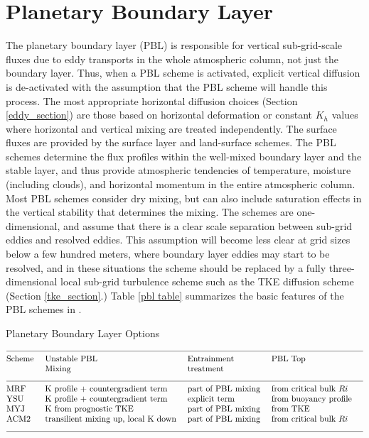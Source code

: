 \section{Planetary Boundary Layer}

The planetary boundary layer (PBL) is responsible for vertical sub-grid-scale 
fluxes due to eddy transports in the whole atmospheric column, not just the 
boundary layer. Thus, when a PBL scheme is activated, explicit vertical 
diffusion is de-activated with the assumption that the PBL scheme will 
handle this process. The most appropriate horizontal diffusion choices
(Section \ref{eddy_section}) are those based on horizontal deformation
or constant $K_h$ values where horizontal and vertical mixing are treated
independently. The surface fluxes are provided by the surface layer 
and land-surface schemes. The PBL schemes determine the flux profiles 
within the well-mixed boundary layer and the stable layer, and thus provide 
atmospheric tendencies of temperature, moisture (including clouds), and 
horizontal momentum in the entire atmospheric column. Most PBL schemes 
consider dry mixing, but can also include saturation effects in the vertical 
stability that determines the mixing. The schemes are one-dimensional, and 
assume that there is a clear scale separation between sub-grid eddies and 
resolved eddies. This assumption will become less clear at grid sizes below a 
few hundred meters, where boundary layer eddies may start to be resolved, and
in these situations the scheme should be replaced by a fully three-dimensional
local sub-grid turbulence scheme such as the TKE diffusion scheme (Section
\ref{tke_section}.)
Table \ref{pbl table} summarizes the basic features of the PBL schemes
in {\wrf}.


\begin{table}
\caption{Planetary Boundary Layer Options}
\label{pbl table}
$$\vbox
{\halign{#\hfil \quad & #\hfil \quad &
#\hfil \quad & #\hfil \quad &  #\hfil \cr
\multispan4\hrulefill \cr
Scheme          & Unstable PBL      &  Entrainment         & PBL Top              \cr
                & Mixing            &  treatment           &                      \cr
\multispan4\hrulefill \cr
MRF  & K profile + countergradient term    &  part of PBL mixing &  from critical bulk $Ri$  \cr
YSU  & K profile + countergradient term   &  explicit term &  from buoyancy profile  \cr
MYJ  & K from prognostic TKE                        &  part of PBL mixing  &  from TKE   \cr
ACM2  & transilient mixing up, local K down         &  part of PBL mixing  &  from critical bulk $Ri$   \cr
\multispan4\hrulefill \cr
}}$$
\end{table}

